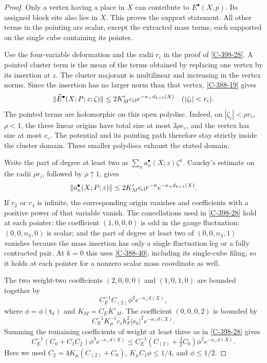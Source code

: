 \documentclass[11pt,letterpaper,reqno]{amsart}
\theoremstyle{definition}
\theoremstyle{remark}
\begin{document}
\begin{proof}
Only a vertex having a place in $X$ can contribute to
$E^\bullet(X,p)$. Its assigned block site also lies in $X$.
This proves the support statement. All other terms in the
pointing are scalar, except the extracted mass terms, each
supported on the single cube containing its pointer.

Use the four-variable deformation and the radii $r_i$ in
the proof of \cref{C-398-28}. A pointed cluster term is the
mean of the terms obtained by replacing one vertex by its
insertion at $z$. The cluster majorant is multilinear and
increasing in the vertex norms. Since the insertion has no
larger norm than that vertex, \cref{C-388-19} gives
\[
 \|\widetilde E^\bullet(X;P;z;\zeta)\|
       \le2K'_Mc_{\rm cl}e^{-\kappa_+d_{k+1}(X)}
       \quad(|\zeta_i|<r_i).
\]
The pointed terms are holomorphic on this open polydisc.
Indeed, on $|\zeta_i|<\rho r_i$, $\rho<1$, the three
linear origins have total size at most $3\rho c_\diamond$,
and the vertex has size at most $c_\diamond$. The potential
and its pointing path therefore stay strictly inside the
cluster domain. These smaller polydiscs exhaust the stated
domain.

Write the part of degree at least two as
$\sum_na_n^\bullet(X;z)\zeta^n$. Cauchy's estimate on
the radii $\rho r_i$, followed by $\rho\uparrow1$, gives
\[
 \|a_n^\bullet(X;P;z)\|
       \le2K'_Mc_{\rm cl}r^{-n}e^{-\kappa_+d_{k+1}(X)}.
\]
If $r_2$ or $r_4$ is infinite, the corresponding origin
vanishes and coefficients with a positive power of that
variable vanish. The cancellations used in
\cref{C-398-28} hold at each pointer: the coefficient
$(1,0,0,0)$ is odd in the gauge fluctuation;
$(0,0,n_3,0)$ is scalar; and the part of degree at least
two of $(0,0,n_3,1)$ vanishes because the mass insertion
has only a single fluctuation leg or a fully contracted pair.
At $k=0$ this uses \cref{C-388-40}, including its single-cube
filing, so it holds at each pointer for a nonzero scalar
mass coordinate as well.

The two weight-two coefficients $(2,0,0,0)$ and
$(1,0,1,0)$ are bounded together by
\[C_E^{-1}C_{(2)}\phi^2e^{-\kappa_+d(X)},\]
where
$\phi=\phi(\mathsf t_k)$ and $K_M=C_EK'_M$.
The coefficient $(0,0,0,2)$ is bounded by
\[C_E^{-1}K_\mu^{-1}c_sh_F^2|s_k|^2e^{-\kappa_+d(X)}.\]
Summing the remaining coefficients of weight at least
three as in \cref{C-398-28} gives
\[
 C_E^{-1}(C_0+C_1C_2)\phi^3e^{-\kappa_+d(X)}
 \le C_E^{-1}(C_{(2)}+\tfrac32C_0)
                       \phi^2e^{-\kappa_+d(X)}.
\]
Here we used $C_2=4K_\mu(C_{(2)}+C_0)$,
$K_\mu C_1\phi\le1/4$, and $\phi\le1/2$.


\end{proof}
\end{document}
